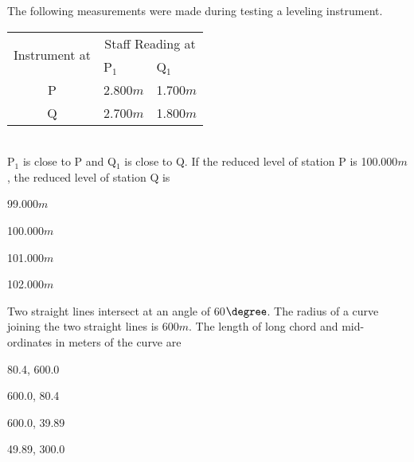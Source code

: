 \item The following measurements were made during testing a leveling instrument.
\begin{table}[h]
    \centering
    \begin{tabular}{|c|p{3cm}|p{3cm}|}
    \hline
    \multirow{2}{*}{Instrument at} & \multicolumn{2}{|c|}{Staff Reading at}\\
    \cline{2-3}
    & P$_1$ & Q$_1$ \\
    \hline
    P & 2.800$m$ & 1.700$m$\\
    \hline
    Q & 2.700$m$ & 1.800$m$\\
    \hline
\end{tabular}
\end{table}\\
P$_1$ is close to P and Q$_1$ is close to Q. If the reduced level of station P is 100.000$m$, the reduced level of station Q is
\begin{enumerate}
\begin{multicols}{4}
\item 99.000$m$
\item 100.000$m$
\item 101.000$m$
\item 102.000$m$
\end{multicols}
\end{enumerate}
\item Two straight lines intersect at an angle of 60$\degree$. The radius of a curve joining the two straight lines is 600$m$. The length of long chord and mid-ordinates in meters of the curve are
\begin{enumerate}
\begin{multicols}{4}
\item 80.4, 600.0
\item 600.0, 80.4
\item 600.0, 39.89
\item 49.89, 300.0
\end{multicols}
\end{enumerate}
